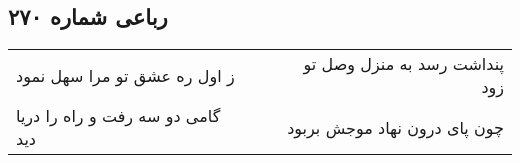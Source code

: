 \begin{center}
\section*{رباعی شماره ۲۷۰}
\label{sec:sh270}
\begin{longtable}{l p{0.5cm} r}
ز اول ره عشق تو مرا سهل نمود
&&
پنداشت رسد به منزل وصل تو زود
\\
گامی دو سه رفت و راه را دریا دید
&&
چون پای درون نهاد موجش بربود
\\
\end{longtable}
\end{center}
